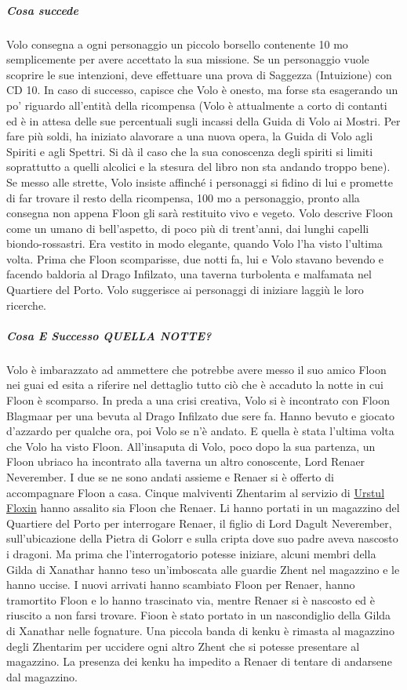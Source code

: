 \documentclass{article}
\begin{document}
\subparagraph{Cosa succede} Volo consegna a ogni personaggio un piccolo borsello
contenente 10 mo semplicemente per avere accettato
la sua missione. Se un personaggio vuole scoprire le
sue intenzioni, deve effettuare una prova di Saggezza
(Intuizione) con CD 10. In caso di successo, capisce che
Volo è onesto, ma forse sta esagerando un po' riguardo
all'entità della ricompensa (Volo è attualmente a corto di
contanti ed è in attesa delle sue percentuali sugli incassi
della Guida di Volo ai Mostri. Per fare più soldi, ha iniziato
alavorare a una nuova opera, la Guida di Volo agli Spiriti e
agli Spettri. Si dà il caso che la sua conoscenza degli spiriti
si limiti soprattutto a quelli alcolici e la stesura del libro non
sta andando troppo bene). Se messo alle strette, Volo insiste
affinché i personaggi si fidino di lui e promette di far trovare
il resto della ricompensa, 100 mo a personaggio, pronto alla
consegna non appena Floon gli sarà restituito vivo e vegeto.
Volo descrive Floon come un umano di bell'aspetto, di
poco più di trent'anni, dai lunghi capelli biondo-rossastri.
Era vestito in modo elegante, quando Volo l’ha visto l’ultima
volta. Prima che Floon scomparisse, due notti fa, lui e Volo
stavano bevendo e facendo baldoria al Drago Infilzato, una
taverna turbolenta e malfamata nel Quartiere del Porto. Volo
suggerisce ai personaggi di iniziare laggiù le loro ricerche. 

\subparagraph{Cosa E Successo QUELLA NOTTE?} Volo è imbarazzato ad ammettere che potrebbe avere
messo il suo amico Floon nei guai ed esita a riferire nel
dettaglio tutto ciò che è accaduto la notte in cui Floon è
scomparso. In preda a una crisi creativa, Volo si è incontrato con
Floon Blagmaar per una bevuta al Drago Infilzato due sere
fa. Hanno bevuto e giocato d'azzardo per qualche ora, poi
Volo se n'è andato. E quella è stata l'ultima volta che Volo
ha visto Floon.
All’insaputa di Volo, poco dopo la sua partenza, un Floon
ubriaco ha incontrato alla taverna un altro conoscente,
Lord Renaer Neverember. I due se ne sono andati assieme
e Renaer si è offerto di accompagnare Floon a casa. Cinque
malviventi Zhentarim al servizio di \hyperlink{urstul}{Urstul Floxin}  hanno assalito sia Floon che Renaer. Li
hanno portati in un magazzino del Quartiere del Porto per
interrogare Renaer, il figlio di Lord Dagult Neverember,
sull’ubicazione della Pietra di Golorr e sulla cripta dove suo
padre aveva nascosto i dragoni. Ma prima che l'interrogatorio
potesse iniziare, alcuni membri della Gilda di Xanathar
hanno teso un'imboscata alle guardie Zhent nel magazzino e
le hanno uccise. I nuovi arrivati hanno scambiato Floon per
Renaer, hanno tramortito Floon e lo hanno trascinato via,
mentre Renaer si è nascosto ed è riuscito a non farsi trovare.
Fioon è stato portato in un nascondiglio della Gilda di
Xanathar nelle fognature. Una piccola banda di kenku è
rimasta al magazzino degli Zhentarim per uccidere ogni
altro Zhent che si potesse presentare al magazzino. La
presenza dei kenku ha impedito a Renaer di tentare di
andarsene dal magazzino.
\end{document}
